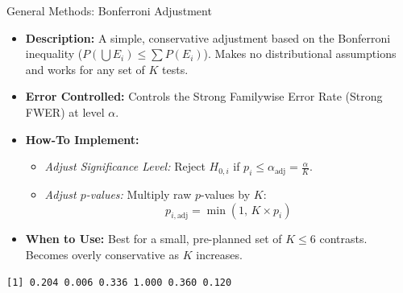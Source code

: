 \begin{frame}{General Methods: Bonferroni Adjustment}
  \begin{itemize}
    \item \textbf{Description:} A simple, conservative adjustment based on the Bonferroni inequality ($P(\bigcup E_i) \le \sum P(E_i)$). Makes no distributional assumptions and works for any set of $K$ tests.
    \item \textbf{Error Controlled:} Controls the \alert{Strong Familywise Error Rate (Strong FWER)} at level $\alpha$.
    \item \textbf{How-To Implement:}
    \begin{itemize}
      \item \textit{Adjust Significance Level:} Reject $H_{0,i}$ if $p_i \le \alpha_{\text{adj}} = \frac{\alpha}{K}$.
      \item \textit{Adjust $p$-values:} Multiply raw $p$-values by $K$: 
      $$p_{i,\text{adj}} = \min(1, \, K \times p_i)$$
    \end{itemize}
    \item \textbf{When to Use:} Best for a small, pre-planned set of $K \le 6$ contrasts. Becomes overly conservative as $K$ increases.
  \end{itemize}
  
  \framebreak
  
\begin{knitrout}\small
{}\color{fgcolor}\begin{kframe}
\begin{alltt}
\hldef{(}
  \hldef{(}\hldef{,} \hldef{,} \hldef{,} \hldef{,} \hldef{,} \hldef{),}
   \hldef{=} 
\hldef{)}
\end{alltt}
\begin{verbatim}
[1] 0.204 0.006 0.336 1.000 0.360 0.120
\end{verbatim}
\end{kframe}
\end{knitrout}
  
\end{frame}

